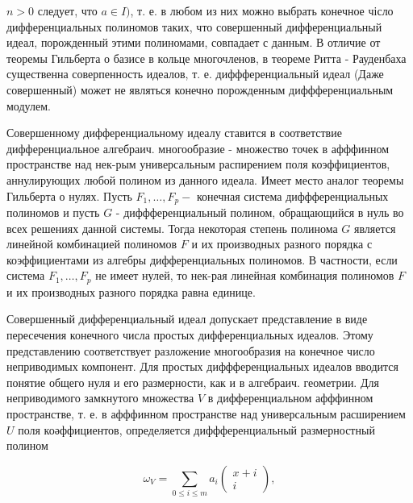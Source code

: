 \documentclass[10pt]{article}
\begin{document}
$n>0$ следует, что $a \in I)$, т. е. в любом из них можно выбрать конечное чісло дифференциальных полиномов таких, что совершенный дифференциальный идеал, порожденный этими полиномами, совпадает с данным. В отличие от теоремы Гильберта о базисе в кольце многочленов, в теореме Ритта - Рауденбаха существенна соверпенность идеалов, т. е. диффференциальный идеал (Даже совершенный) может не являться конечно порожденным диффференциальным модулем.



Совершенному дифференциальному идеалу ставится в соответствие дифференциальное алгебраич. многообразие - множество точек в афффинном пространстве над нек-рым универсальным распирением поля коэффициентов, аннулирующих любой полином из данного идеала. Имеет место аналог теоремы Гильберта о нулях. Пусть $F_{1}, \ldots, F_{p}-$ конечная система диффференциальных полиномов и пусть $G$ - диффференциальный полином, обращающийся в нуль во всех решениях данной системы. Тогда некоторая степень полинома $G$ является линейной комбинацией полиномов $F$ и их производных разного порядка с коэффициентами из алгебры дифференциальных полиномов. В частности, если система $F_{1}, \ldots, F_{p}$ не имеет нулей, то нек-рая линейная комбинация полиномов $F$ и их производных разного порядка равна единице.



Совершенный дифференциальный идеал допускает представление в виде пересечения конечного числа простых дифференциальных идеалов. Этому представлению соответствует разложение многообразия на конечное число неприводимых компонент. Для простых диффференциальных идеалов вводится понятие общего нуля и его размерности, как и в алгебраич. геометрии. Для неприводимого замкнутого множества $V$ в дифференциальном афффинном пространстве, т. е. в афффинном пространстве над универсальным расширением $U$ поля коәффициентов, определяется диффференциальный размерностный полином



\[

\omega_{V}=\sum_{0 \leqslant i \leqslant m} a_{i}\left(\begin{array}{c}

x+i \\

i

\end{array}\right),

\]
\end{document}
